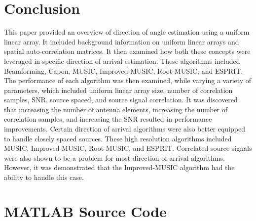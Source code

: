 \documentclass[conference]{IEEEtran}
\begin{document}
	\section{Conclusion}
		
	This paper provided an overview of direction of angle estimation using a uniform linear array. It included background information on uniform linear arrays and spatial auto-correlation matrices. It then examined how both these concepts were leveraged in specific direction of arrival estimation. These algorithms included Beamforming, Capon, MUSIC, Improved-MUSIC, Root-MUSIC, and ESPRIT. The performance of each algorithm was then examined, while varying a variety of parameters, which included uniform linear array size, number of correlation samples, SNR, source spaced, and source signal correlation. It was discovered that increasing the number of antenna elements, increasing the number of correlation samples, and increasing the SNR resulted in performance improvements. Certain direction of arrival algorithms were also better equipped to handle closely spaced sources. These high resolution algorithms included MUSIC, Improved-MUSIC, Root-MUSIC, and ESPRIT. Correlated source signals were also shown to be a problem for most direction of arrival algorithms. However, it was demonstrated that the Improved-MUSIC algorithm had the ability to handle this case.
	 
	
	
	\onecolumn
	\pagebreak
	\appendices
	\section{MATLAB Source Code}
	\label{appendix::matlab_code}
\end{document}

